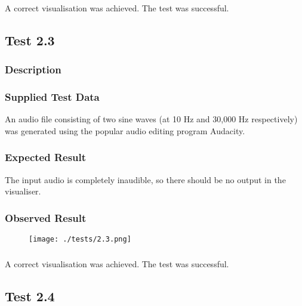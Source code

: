 \subsubsection{}
A correct visualisation was achieved. The test was successful.

\pagebreak
\subsection{Test 2.3}
\subsubsection{Description}
\paragraph{}
{
	\centering
}

\subsubsection{Supplied Test Data}
An audio file consisting of two sine waves (at 10 Hz and 30,000 Hz respectively) was generated using the popular audio editing program Audacity.

\subsubsection{Expected Result}
The input audio is completely inaudible, so there should be no output in the visualiser.

\subsubsection{Observed Result}
\begin{figure}[H]
	\texttt{[image: ./tests/2.3.png]}
\end{figure}

\subsubsection{}
A correct visualisation was achieved. The test was successful.

\pagebreak
\subsection{Test 2.4}
